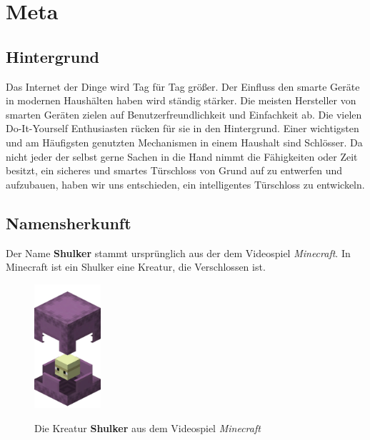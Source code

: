 \chapter{Meta}

\section{Hintergrund}

Das Internet der Dinge wird Tag für Tag größer. Der Einfluss den smarte Geräte in modernen Haushälten haben wird ständig stärker. Die meisten Hersteller von smarten Geräten zielen auf Benutzerfreundlichkeit und Einfachkeit ab. Die vielen Do-It-Yourself Enthusiasten rücken für sie in den Hintergrund. Einer wichtigsten und am Häufigsten genutzten Mechanismen in einem Haushalt sind Schlösser.  Da nicht jeder der selbst gerne Sachen in die Hand nimmt die Fähigkeiten oder Zeit besitzt, ein sicheres und smartes Türschloss von Grund auf zu entwerfen und aufzubauen, haben wir uns entschieden, ein intelligentes Türschloss zu entwickeln.

\section{Namensherkunft}

Der Name \textbf{Shulker} stammt ursprünglich aus der dem Videospiel \textit{Minecraft}. In Minecraft ist ein Shulker eine Kreatur, die Verschlossen ist.

\begin{figure}[H]
    \begin{center}
        \includegraphics[width=0.22\textwidth]{images/Intro/Shulker.png}
        \caption{Die Kreatur \textbf{Shulker} aus dem Videospiel \textit{Minecraft}}
        \cite{mcwiki2015}
    \end{center}
\end{figure}

\newpage